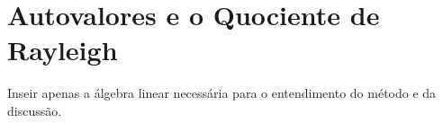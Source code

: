 \chapter{Autovalores e o Quociente de Rayleigh\label{cap:algebra}}


Inseir apenas a álgebra linear necessária para o entendimento do método e da discussão.